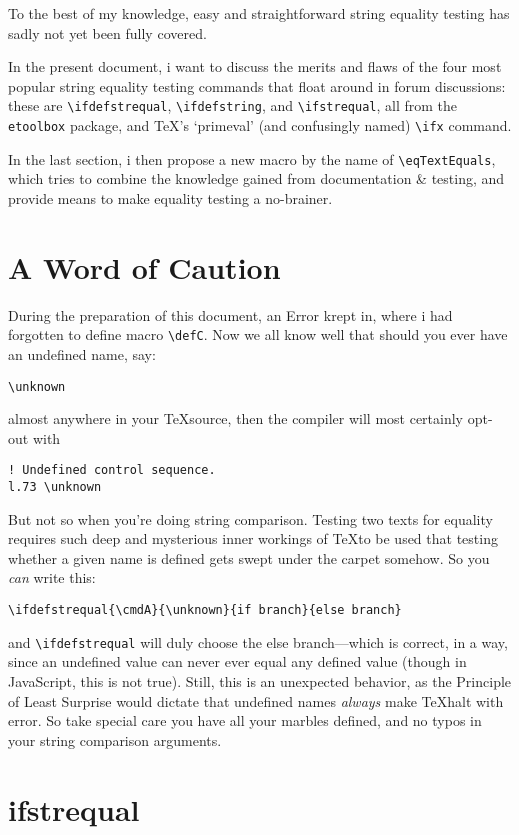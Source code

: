 \documentclass[a5paper,10pt,german]{memoir}
\newcommand{\cmdA}{sometext}
\def\defC{othertext}
\begin{document}
To the best of my knowledge, easy and straightforward string equality testing has sadly not yet been fully
covered.

In the present document, i want to discuss the merits and flaws of the four most popular string equality
testing commands that float around in forum discussions: these are \verb#\ifdefstrequal#,
\verb#\ifdefstring#, and \verb#\ifstrequal#, all from the \verb#etoolbox# package, and \TeX's `primeval'
(and confusingly named) \verb#\ifx# command.

In the last section, i then propose a new macro by the name of \verb#\eqTextEquals#, which tries to combine the
knowledge gained from documentation \& testing, and provide means to make equality testing a no-brainer.



\newpage
\section{A Word of Caution}

During the preparation of this document, an Error krept in, where i had forgotten to define macro
\verb#\defC#. Now we all know well that should you ever have an undefined name, say:

\verb#\unknown#

almost anywhere in your \TeX source, then the compiler will most certainly opt-out with

\verb#! Undefined control sequence.#\\
\verb#l.73 \unknown#

But not so when you're doing string comparison. Testing two texts for equality requires such deep and
mysterious inner workings of \TeX to be used that testing whether a given name is defined gets swept under
the carpet somehow. So you {\em can} write this:

\verb#\ifdefstrequal{\cmdA}{\unknown}{if branch}{else branch}#

and \verb#\ifdefstrequal# will duly choose the else branch—which is correct, in a way, since an undefined
value can never ever equal any defined value (though in JavaScript, this is not true). Still, this is an
unexpected behavior, as the Principle of Least Surprise would dictate that undefined names {\em always}
make \TeX halt with error. So take special care you have all your marbles defined, and no typos in your
string comparison arguments.


\newpage
\section{ifstrequal}
\end{document}
